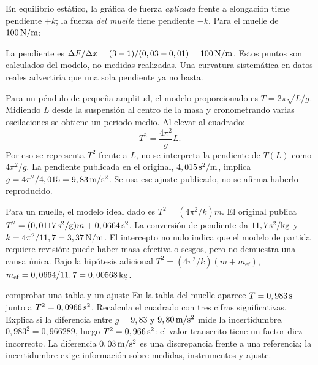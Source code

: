 \documentclass[11pt,a4paper]{article}
\begin{document}
En equilibrio est\'atico, la gr\'afica de fuerza \emph{aplicada} frente a elongaci\'on
tiene pendiente $+k$; la fuerza \emph{del muelle} tiene pendiente $-k$.
Para el muelle de $100\,\mathrm{N/m}$:
\begin{center}
\end{center}
La pendiente es $\Delta F/\Delta x=(3-1)/(0,03-0,01)=100\,\mathrm{N/m}$.
Estos puntos son calculados del modelo, no medidas realizadas.
Una curvatura sistem\'atica en datos reales advertir\'ia que una sola pendiente ya no basta.

Para un p\'endulo de peque\~na amplitud, el modelo proporcionado es
$T=2\pi\sqrt{L/g}$. Midiendo $L$ desde la suspensi\'on al centro de la masa y
cronometrando varias oscilaciones se obtiene un periodo medio.
Al elevar al cuadrado:
\[
T^2=\frac{4\pi^2}{g}L.
\]
Por eso se representa $T^2$ frente a $L$, no se interpreta la pendiente de $T(L)$
como $4\pi^2/g$. La pendiente publicada en el original,
$4,015\,\mathrm{s^2/m}$, implica $g=4\pi^2/4,015=9,83\,\mathrm{m/s^2}$.
Se usa ese ajuste publicado, no se afirma haberlo reproducido.

Para un muelle, el modelo ideal dado es $T^2=(4\pi^2/k)m$.
El original publica $T^2=(0,0117\,\mathrm{s^2/g})m+0,0664\,\mathrm{s^2}$.
La conversi\'on de pendiente da $11,7\,\mathrm{s^2/kg}$ y
$k=4\pi^2/11,7=3,37\,\mathrm{N/m}$.
El intercepto no nulo indica que el modelo de partida requiere revisi\'on:
puede haber masa efectiva o sesgos, pero no demuestra una causa \'unica.
Bajo la hip\'otesis adicional $T^2=(4\pi^2/k)(m+m_{\mathrm{ef}})$,
$m_{\mathrm{ef}}=0,0664/11,7=0,00568\,\mathrm{kg}$.

\begin{exercisebox}{comprobar una tabla y un ajuste}
En la tabla del muelle aparece $T=0,983\,\mathrm{s}$ junto a
$T^2=0,0966\,\mathrm{s^2}$. Recalcula el cuadrado con tres cifras significativas.
Explica si la diferencia entre $g=9,83$ y $9,80\,\mathrm{m/s^2}$ mide la incertidumbre.
\solutionblock
$0,983^2=0,966289$, luego $T^2=0,966\,\mathrm{s^2}$:
el valor transcrito tiene un factor diez incorrecto.
La diferencia $0,03\,\mathrm{m/s^2}$ es una discrepancia frente a una referencia;
la incertidumbre exige informaci\'on sobre medidas, instrumentos y ajuste.
\end{exercisebox}
\end{document}
